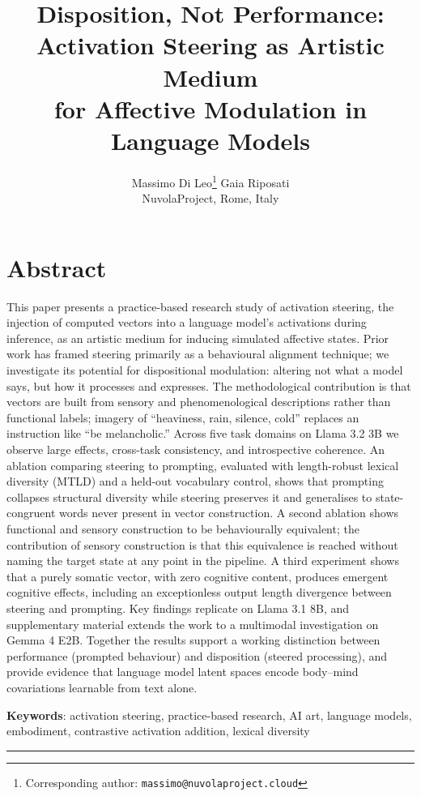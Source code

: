 \documentclass[11pt,a4paper]{article}
\title{Disposition, Not Performance:\\
Activation Steering as Artistic Medium\\
for Affective Modulation in Language Models}
\author{Massimo Di Leo\thanks{Corresponding author: \texttt{massimo@nuvolaproject.cloud}} \quad Gaia Riposati \\
\small NuvolaProject, Rome, Italy}
\date{}
\begin{document}
\maketitle

\section*{Abstract}

This paper presents a practice-based research study of activation steering, the injection of computed vectors into a language model's activations during inference, as an artistic medium for inducing simulated affective states. Prior work has framed steering primarily as a behavioural alignment technique; we investigate its potential for dispositional modulation: altering not what a model says, but how it processes and expresses. The methodological contribution is that vectors are built from sensory and phenomenological descriptions rather than functional labels; imagery of ``heaviness, rain, silence, cold'' replaces an instruction like ``be melancholic.'' Across five task domains on Llama 3.2 3B we observe large effects, cross-task consistency, and introspective coherence. An ablation comparing steering to prompting, evaluated with length-robust lexical diversity (MTLD) and a held-out vocabulary control, shows that prompting collapses structural diversity while steering preserves it and generalises to state-congruent words never present in vector construction. A second ablation shows functional and sensory construction to be behaviourally equivalent; the contribution of sensory construction is that this equivalence is reached without naming the target state at any point in the pipeline. A third experiment shows that a purely somatic vector, with zero cognitive content, produces emergent cognitive effects, including an exceptionless output length divergence between steering and prompting. Key findings replicate on Llama 3.1 8B, and supplementary material extends the work to a multimodal investigation on Gemma 4 E2B. Together the results support a working distinction between performance (prompted behaviour) and disposition (steered processing), and provide evidence that language model latent spaces encode body--mind covariations learnable from text alone.

\textbf{Keywords}: activation steering, practice-based research, AI art, language models, embodiment, contrastive activation addition, lexical diversity

\begin{center}\rule{0.5\linewidth}{0.5pt}\end{center}
\end{document}
